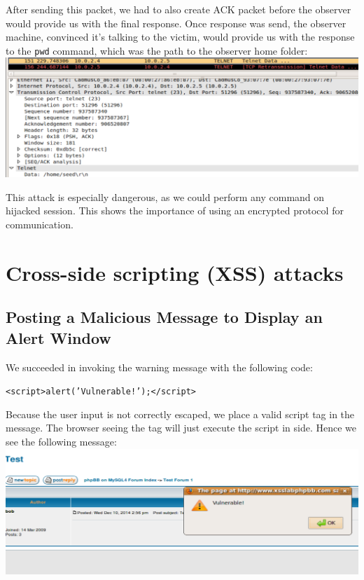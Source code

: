 \documentclass[12pt, a4paper, pdflatex]{article}
\begin{document}
After sending this packet, we had to also create ACK packet before the observer would provide us with the final response. Once response was send, the observer machine, convinced it's talking to the victim, would provide us with the response to the \texttt{pwd} command, which was the path to the observer home folder:\\

\includegraphics[width=.95\textwidth]{gfx/response.png}

This attack is especially dangerous, as we could perform any command on hijacked session. This shows the importance of using an encrypted protocol for communication.

\section{Cross-side scripting (XSS) attacks}

\subsection{Posting a Malicious Message to Display an Alert Window}
We succeeded in invoking the warning message with the following code:\\
\begin{center}\texttt{<script>alert('Vulnerable!');</script>}\end{center}
Because the user input is not correctly escaped, we place a valid script tag in the message. The browser seeing the tag will just execute the script in side. Hence we see the following message:\\
\includegraphics[width=.95\textwidth]{gfx/xss/task1.png}
\end{document}
